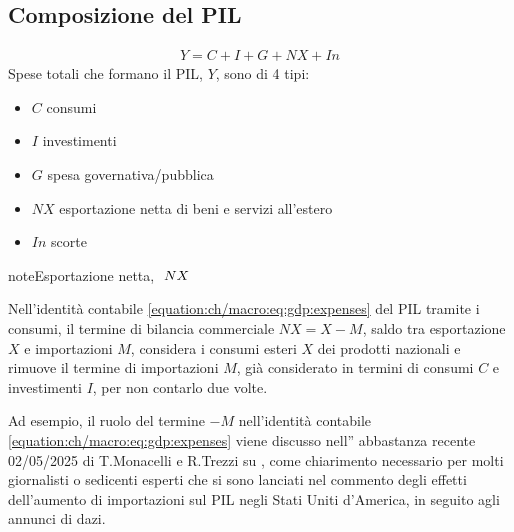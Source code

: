 \documentclass[letterpaper,10pt,italian]{jupyterBook}
\begin{document}
\subsection{Composizione del PIL}
\label{\detokenize{ch/macro:composizione-del-pil}}\label{\detokenize{ch/macro:economics-hs-macro-intro-gdp}}\begin{equation}\label{equation:ch/macro:eq:gdp:expenses}
\begin{split}Y = C + I + G + NX + In\end{split}
\end{equation}
\sphinxAtStartPar
Spese totali che formano il PIL, \(Y\), sono di 4 tipi:
\begin{itemize}
\item {} 
\sphinxAtStartPar
\(C\) consumi

\item {} 
\sphinxAtStartPar
\(I\) investimenti

\item {} 
\sphinxAtStartPar
\(G\) spesa governativa/pubblica

\item {} 
\sphinxAtStartPar
\(NX\) esportazione netta di beni e servizi all’estero

\item {} 
\sphinxAtStartPar
\(In\) scorte

\end{itemize}

\begin{sphinxadmonition}{note}{Esportazione netta, \protect\(\ NX\protect\)}

\sphinxAtStartPar
Nell’identità contabile \eqref{equation:ch/macro:eq:gdp:expenses} del PIL tramite i consumi, il termine di bilancia commerciale \(NX = X - M\), saldo tra esportazione \(X\) e importazioni \(M\), considera i consumi esteri \(X\) dei prodotti nazionali e rimuove il termine di importazioni \(M\), già considerato in termini di consumi \(C\) e investimenti \(I\), per non contarlo due volte.

\sphinxAtStartPar
Ad esempio, il ruolo del termine \(-M\) nell’identità contabile \eqref{equation:ch/macro:eq:gdp:expenses} viene discusso nell” abbastanza recente \sphinxhyphen{} 02/05/2025 \sphinxhyphen{} di T.Monacelli e R.Trezzi su , come chiarimento necessario per molti giornalisti o sedicenti esperti che si sono lanciati nel commento degli effetti dell’aumento di importazioni sul PIL negli Stati Uniti d’America, in seguito agli annunci di dazi.
\end{sphinxadmonition}
\end{document}
